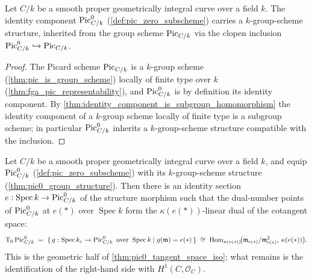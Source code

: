 \begin{theorem}\leanok
  \label{thm:pic0_group_structure}
  Let \(C/k\) be a smooth proper geometrically integral curve over a
  field \(k\). The identity component \(\operatorname{Pic}^0_{C/k}\)
  (\cref{def:pic_zero_subscheme}) carries a \(k\)-group-scheme
  structure, inherited from the group scheme \(\operatorname{Pic}_{C/k}\) via the
  clopen inclusion \(\operatorname{Pic}^0_{C/k} \hookrightarrow \operatorname{Pic}_{C/k}\).
\end{theorem}

\begin{proof}\leanok
  The Picard scheme \(\operatorname{Pic}_{C/k}\) is a \(k\)-group scheme
  (\cref{thm:pic_is_group_scheme}) locally of finite type over \(k\)
  (\cref{thm:fga_pic_representability}), and \(\operatorname{Pic}^0_{C/k}\) is by
  definition its identity component. By
  \cref{thm:identity_component_is_subgroup_homomorphism} the identity
  component of a \(k\)-group scheme locally of finite type is a
  subgroup scheme; in particular \(\operatorname{Pic}^0_{C/k}\) inherits a
  \(k\)-group-scheme structure compatible with the inclusion.
\end{proof}

\begin{theorem}\leanok
  \label{thm:pic0_tangent_cotangent_dual}
  Let \(C/k\) be a smooth proper geometrically integral curve over a
  field \(k\), and equip \(\operatorname{Pic}^0_{C/k}\)
  (\cref{def:pic_zero_subscheme}) with its \(k\)-group-scheme
  structure (\cref{thm:pic0_group_structure}). Then there
  is an identity section \(e : \operatorname{Spec} k \to
  \operatorname{Pic}^0_{C/k}\) of the structure morphism such that the dual-number
  points of \(\operatorname{Pic}^0_{C/k}\) at \(e(*)\) over \(\operatorname{Spec} k\)
  form the \(\kappa(e(*))\)-linear dual of the cotangent space:
  \[
    \textup T_0 \operatorname{Pic}^0_{C/k}
    \;=\;
    \{\, g : \operatorname{Spec} k_\varepsilon \to \operatorname{Pic}^0_{C/k}
        \text{ over } \operatorname{Spec} k
        \mid g(\mathfrak m) = e(*) \,\}
    \;\cong\;
    \operatorname{Hom}_{\kappa(e(*))}\!\bigl(
      \mathfrak m_{e(*)}/\mathfrak m_{e(*)}^2,\, \kappa(e(*))\bigr).
  \]
  This is the geometric half of \cref{thm:pic0_tangent_space_iso};
  what remains is the identification of the right-hand side with
  \(H^1(C, \mathcal O_C)\).
\end{theorem}

